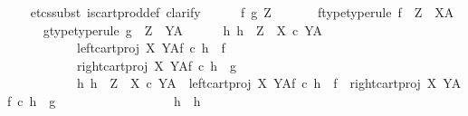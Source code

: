 \begin{isabellebody}
\ \ \isamarkupfalse%
\ {\isacharparenleft}{\kern0pt}etcs{\isacharunderscore}{\kern0pt}subst\ is{\isacharunderscore}{\kern0pt}cart{\isacharunderscore}{\kern0pt}prod{\isacharunderscore}{\kern0pt}def{}{\isacharcomma}{\kern0pt}\ clarify{\isacharparenright}{\kern0pt}\isanewline
\ \ \ \ \isamarkupfalse%
\ f\ g\ Z\ \isanewline
\ \ \ \ \isamarkupfalse%
\ f{\isacharunderscore}{\kern0pt}type{\isacharbrackleft}{\kern0pt}type{\isacharunderscore}{\kern0pt}rule{\isacharbrackright}{\kern0pt}{\isacharcolon}{\kern0pt}\ {\isachardoublequoteopen}f\ {\isacharcolon}{\kern0pt}\ Z\ {\isasymrightarrow}\ X\isactrlbsup A\isactrlesup {\isachardoublequoteclose}\isanewline
\ \ \ \ \isamarkupfalse%
\ g{\isacharunderscore}{\kern0pt}type{\isacharbrackleft}{\kern0pt}type{\isacharunderscore}{\kern0pt}rule{\isacharbrackright}{\kern0pt}{\isacharcolon}{\kern0pt}\ {\isachardoublequoteopen}g\ {\isacharcolon}{\kern0pt}\ Z\ {\isasymrightarrow}\ Y\isactrlbsup A\isactrlesup {\isachardoublequoteclose}\isanewline
\isanewline
\ \ \ \ \isamarkupfalse%
\ {\isachardoublequoteopen}{\isasymexists}h{\isachardot}{\kern0pt}\ h\ {\isacharcolon}{\kern0pt}\ Z\ {\isasymrightarrow}\ {\isacharparenleft}{\kern0pt}X\ {\isasymtimes}\isactrlsub c\ Y{\isacharparenright}{\kern0pt}\isactrlbsup A\isactrlesup \ {\isasymand}\isanewline
\ \ \ \ \ \ \ \ \ \ \ left{\isacharunderscore}{\kern0pt}cart{\isacharunderscore}{\kern0pt}proj\ X\ Y\isactrlbsup A\isactrlesup \isactrlsub f\ {\isasymcirc}\isactrlsub c\ h\ {\isacharequal}{\kern0pt}\ f\ {\isasymand}\isanewline
\ \ \ \ \ \ \ \ \ \ \ right{\isacharunderscore}{\kern0pt}cart{\isacharunderscore}{\kern0pt}proj\ X\ Y\isactrlbsup A\isactrlesup \isactrlsub f\ {\isasymcirc}\isactrlsub c\ h\ {\isacharequal}{\kern0pt}\ g\ {\isasymand}\isanewline
\ \ \ \ \ \ \ \ \ \ \ {\isacharparenleft}{\kern0pt}{\isasymforall}h{}{\isachardot}{\kern0pt}\ h{}\ {\isacharcolon}{\kern0pt}\ Z\ {\isasymrightarrow}\ {\isacharparenleft}{\kern0pt}X\ {\isasymtimes}\isactrlsub c\ Y{\isacharparenright}{\kern0pt}\isactrlbsup A\isactrlesup \ {\isasymand}\ left{\isacharunderscore}{\kern0pt}cart{\isacharunderscore}{\kern0pt}proj\ X\ Y\isactrlbsup A\isactrlesup \isactrlsub f\ {\isasymcirc}\isactrlsub c\ h{}\ {\isacharequal}{\kern0pt}\ f\ {\isasymand}\ right{\isacharunderscore}{\kern0pt}cart{\isacharunderscore}{\kern0pt}proj\ X\ Y\isactrlbsup A\isactrlesup \isactrlsub f\ {\isasymcirc}\isactrlsub c\ h{}\ {\isacharequal}{\kern0pt}\ g\ {\isasymlongrightarrow}\isanewline
\ \ \ \ \ \ \ \ \ \ \ \ \ \ \ \ \ h{}\ {\isacharequal}{\kern0pt}\ h{\isacharparenright}{\kern0pt}{\isachardoublequoteclose}\isanewline

\end{isabellebody}
